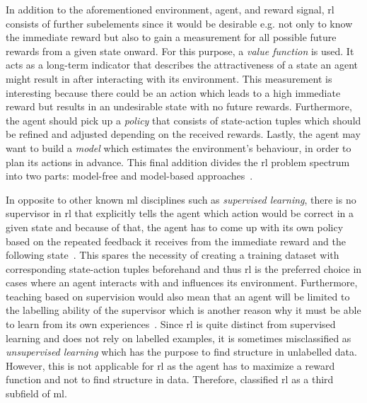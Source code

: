 \documentclass[draft,final]{vutinfth} %
\begin{document}
    In addition to the aforementioned environment, agent, and reward signal, \gls{rl} consists of further subelements since it would be desirable e.g. not only to know the immediate reward but also to gain a measurement for all possible future rewards from a given state onward.
    For this purpose, a \textit{value function} is used.
    It acts as a long-term indicator that describes the attractiveness of a state an agent might result in after interacting with its environment.
    This measurement is interesting because there could be an action which leads to a high immediate reward but results in an undesirable state with no future rewards.
    Furthermore, the agent should pick up a \textit{policy} that consists of state-action tuples which should be refined and adjusted depending on the received rewards.
    Lastly, the agent may want to build a \textit{model} which estimates the environment's behaviour, in order to plan its actions in advance.
    This final addition divides the \gls{rl} problem spectrum into two parts: model-free and model-based approaches~\citep{sutton_reinforcement_2018}.


    In opposite to other known \gls{ml} disciplines such as \textit{supervised learning}, there is no supervisor in \gls{rl} that explicitly tells the agent which action would be correct in a given state and because of that, the agent has to come up with its own policy based on the repeated feedback it receives from the immediate reward and the following state~\citep{kaelbling_reinforcement_1996}.
    This spares the necessity of creating a training dataset with corresponding state-action tuples beforehand and thus \gls{rl} is the preferred choice in cases where an agent interacts with and influences its environment.
    Furthermore, teaching based on supervision would also mean that an agent will be limited to the labelling ability of the supervisor which is another reason why it must be able to learn from its own experiences~\citep{silver_lecture_2015-2}.
    Since \gls{rl} is quite distinct from supervised learning and does not rely on labelled examples, it is sometimes misclassified as \textit{unsupervised learning} which has the purpose to find structure in unlabelled data.
    However, this is not applicable for \gls{rl} as the agent has to maximize a reward function and not to find structure in data.
    Therefore, \citeauthor{sutton_reinforcement_2018} classified \gls{rl}  as a third subfield of \gls{ml}.
\end{document}
